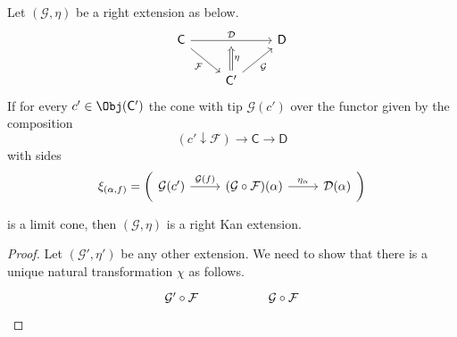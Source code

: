 \documentclass[main.tex]{subfiles}
\begin{document}
\begin{lemma}
  \label{lemma:extension_whose_cones_are_limits_is_kan}
  Let $(\mathcal{G}, \eta)$ be a right extension as below.
  \begin{equation*}
    \begin{tikzcd}
      \mathsf{C}
      \arrow[dr, swap, "\mathcal{F}"]
      \arrow[rr, "\mathcal{D}", ""'{name=U}]
      && \mathsf{D}
      \\
      & \mathsf{C'}
      \arrow[ur, swap, "\mathcal{G}"]
      \arrow[d, to=U, Rightarrow, swap, "\eta"]
    \end{tikzcd}
  \end{equation*}
  If for every $c' \in \Obj(\mathsf{C'})$ the cone with tip $\mathcal{G}(c')$ over the functor given by the composition
  \begin{equation*}
    (c' \downarrow \mathcal{F}) \to \mathsf{C} \to \mathsf{D}
  \end{equation*}
  with sides
  \begin{equation*}
    \xi_{(\alpha, f)} = \left( \begin{tikzcd} \mathcal{G}(c') \arrow[r, "\mathcal{G}(f)"] & (\mathcal{G} \circ \mathcal{F})(\alpha) \arrow[r, "\eta_{\alpha}"] & \mathcal{D}(\alpha) \end{tikzcd} \right)
  \end{equation*}

  is a limit cone, then $(\mathcal{G}, \eta)$ is a right Kan extension.
\end{lemma}
\begin{proof}
  Let $(\mathcal{G}', \eta')$ be any other extension. We need to show that there is a unique natural transformation $\chi$ as follows.
  \begin{equation*}
    \begin{tikzcd}
      \mathcal{G}' \circ \mathcal{F}
      && \mathcal{G} \circ \mathcal{F}
    \end{tikzcd}
  \end{equation*}
\end{proof}
\end{document}
